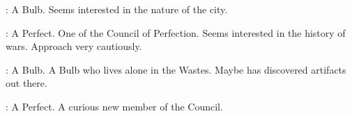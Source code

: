 \documentclass[blue]{Silversiders}
\begin{document}
\begin{itemz}
	\item \cBeauty{}: A \cBeauty{\sex} Bulb. Seems interested in the nature of the city.
	\item \cWar{}: A \cWar{\sex} Perfect. One of the Council of Perfection. Seems interested in the history of wars. Approach very cautiously.
	\item \cOutcast{}: A \cOutcast{\sex} Bulb. A Bulb who lives alone in the Wastes. Maybe \cOutcast{\they} has discovered artifacts out there.
	\item \cFamine{}: A \cFamine{\sex} Perfect. A curious new member of the Council.

\end{itemz}
\end{document}
